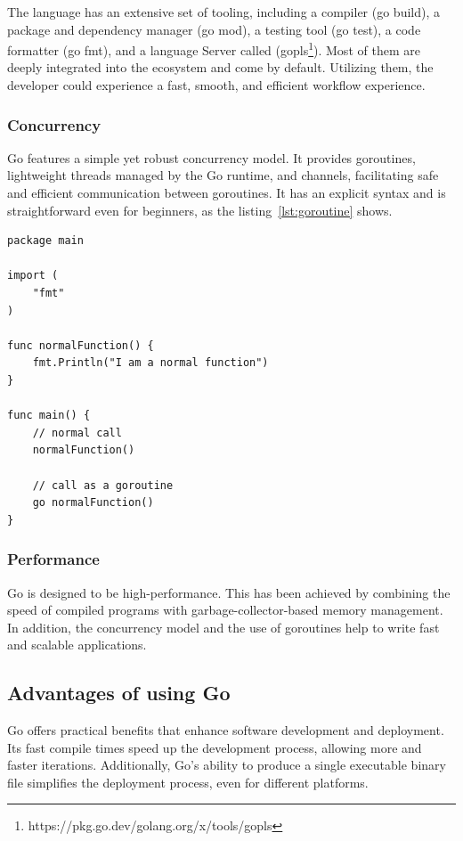 The language has an extensive set of tooling, including a compiler (go build), a package and dependency manager (go mod), a testing tool (go test), a code formatter (go fmt), and a language Server called (gopls\footnote{https://pkg.go.dev/golang.org/x/tools/gopls}). Most of them are deeply integrated into the ecosystem and come by default. Utilizing them, the developer could experience a fast, smooth, and efficient workflow experience.

\subsubsection{Concurrency}
Go features a simple yet robust concurrency model. It provides goroutines, lightweight threads managed by the Go runtime, and channels, facilitating safe and efficient communication between goroutines. It has an explicit syntax and is straightforward even for beginners, as the listing~\ref{lst:goroutine} shows.

\begin{lstlisting}[caption=Calling a normal function as a goroutine,label=lst:goroutine, float]
package main

import (
	"fmt"
)

func normalFunction() {
	fmt.Println("I am a normal function")
}

func main() {
	// normal call
	normalFunction()

	// call as a goroutine
	go normalFunction()
}

\end{lstlisting}

\subsubsection{Performance}

Go is designed to be high-performance. This has been achieved by combining the speed of compiled programs with garbage-collector-based memory management. In addition, the concurrency model and the use of goroutines help to write fast and scalable applications.

\subsection{Advantages of using Go}

Go offers practical benefits that enhance software development and deployment. Its fast compile times speed up the development process, allowing more and faster iterations. Additionally, Go's ability to produce a single executable binary file simplifies the deployment process, even for different platforms.

